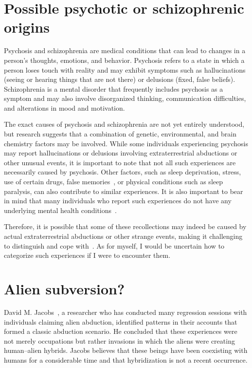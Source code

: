 \section{Possible psychotic or schizophrenic origins}
\label{2023-UFO-part-Perception-abductions-pposo}

Psychosis and schizophrenia are medical conditions that can lead to changes in a person's thoughts, emotions, and behavior. Psychosis refers to a state in which a person loses touch with reality and may exhibit symptoms such as hallucinations (seeing or hearing things that are not there) or delusions (fixed, false beliefs). Schizophrenia is a mental disorder that frequently includes psychosis as a symptom and may also involve disorganized thinking, communication difficulties, and alterations in mood and motivation.

The exact causes of psychosis and schizophrenia are not yet entirely understood, but research suggests that a combination of genetic, environmental, and brain chemistry factors may be involved. While some individuals experiencing psychosis may report hallucinations or delusions involving extraterrestrial abductions or other unusual events, it is important to note that not all such experiences are necessarily caused by psychosis. Other factors, such as sleep deprivation, stress, use of certain drugs, false memories~\cite{Clancy_2002m}, or physical conditions such as sleep paralysis, can also contribute to similar experiences. It is also important to bear in mind that many individuals who report such experiences do not have any underlying mental health conditions~\cite{Holden_2002}.

Therefore, it is possible that some of these recollections may indeed be caused by actual extraterrestrial abductions or other strange events, making it challenging to distinguish and cope with~\cite{Appelle1995,Appelle2000}. As for myself, I would be uncertain how to categorize such experiences if I were to encounter them.


\section{Alien subversion?}
\label{2023-UFO-part-Perception-abductions-alsub}

David M. Jacobs~\cite{Jacobs1993Apr,Jacobs1999Mar,Jacobs2015Sep,Jacobs2015Oct},
a researcher who has conducted many regression sessions with individuals claiming alien abduction, identified patterns in their accounts that formed a classic abduction scenario. He concluded that these experiences were not merely occupations but rather invasions in which the aliens were creating human--alien hybrids. Jacobs believes that these beings have been coexisting with humans for a considerable time and that hybridization is not a recent occurrence.

